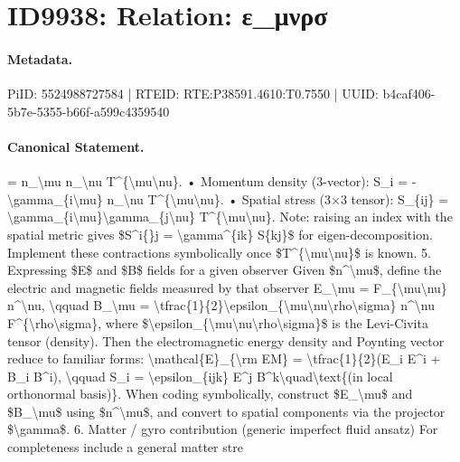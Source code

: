 \section*{ID9938: Relation: ε\_μνρσ}
\paragraph{Metadata.}
PiID: 5524988727584 | RTEID: RTE:P38591.4610:T0.7550 | UUID: b4caf406-5b7e-5355-b66f-a599c4359540

\paragraph{Canonical Statement.}
= n\_\textbackslash{}mu n\_\textbackslash{}nu T\textasciicircum{}\{\textbackslash{}mu\textbackslash{}nu\}. • Momentum density (3-vector): S\_i = -\textbackslash{}gamma\_\{i\textbackslash{}mu\} n\_\textbackslash{}nu T\textasciicircum{}\{\textbackslash{}mu\textbackslash{}nu\}. • Spatial stress (3×3 tensor): S\_\{ij\} = \textbackslash{}gamma\_\{i\textbackslash{}mu\}\textbackslash{}gamma\_\{j\textbackslash{}nu\} T\textasciicircum{}\{\textbackslash{}mu\textbackslash{}nu\}. Note: raising an index with the spatial metric gives \$S\textasciicircum{}i\{\}j = \textbackslash{}gamma\textasciicircum{}\{ik\} S\{kj\}\$ for eigen-decomposition. Implement these contractions symbolically once \$T\textasciicircum{}\{\textbackslash{}mu\textbackslash{}nu\}\$ is known. 5. Expressing \$E\$ and \$B\$ fields for a given observer Given \$n\textasciicircum{}\textbackslash{}mu\$, define the electric and magnetic fields measured by that observer E\_\textbackslash{}mu = F\_\{\textbackslash{}mu\textbackslash{}nu\} n\textasciicircum{}\textbackslash{}nu, \textbackslash{}qquad B\_\textbackslash{}mu = \textbackslash{}tfrac\{1\}\{2\}\textbackslash{}epsilon\_\{\textbackslash{}mu\textbackslash{}nu\textbackslash{}rho\textbackslash{}sigma\} n\textasciicircum{}\textbackslash{}nu F\textasciicircum{}\{\textbackslash{}rho\textbackslash{}sigma\}, where \$\textbackslash{}epsilon\_\{\textbackslash{}mu\textbackslash{}nu\textbackslash{}rho\textbackslash{}sigma\}\$ is the Levi-Civita tensor (density). Then the electromagnetic energy density and Poynting vector reduce to familiar forms: \textbackslash{}mathcal\{E\}\_\{\textbackslash{}rm EM\} = \textbackslash{}tfrac\{1\}\{2\}(E\_i E\textasciicircum{}i + B\_i B\textasciicircum{}i), \textbackslash{}qquad S\_i = \textbackslash{}epsilon\_\{ijk\} E\textasciicircum{}j B\textasciicircum{}k\textbackslash{}quad\textbackslash{}text\{(in local orthonormal basis)\}. When coding symbolically, construct \$E\_\textbackslash{}mu\$ and \$B\_\textbackslash{}mu\$ using \$n\textasciicircum{}\textbackslash{}mu\$, and convert to spatial components via the projector \$\textbackslash{}gamma\$. 6. Matter / gyro contribution (generic imperfect fluid ansatz) For completeness include a general matter stre


